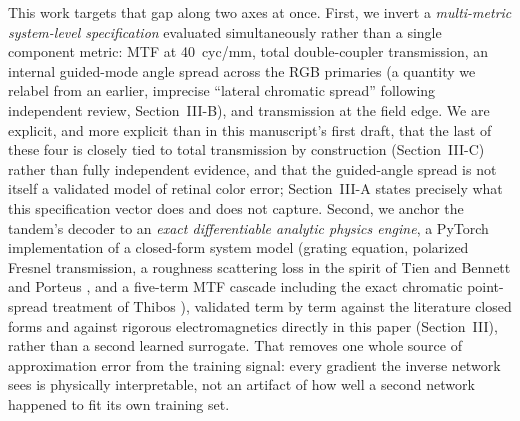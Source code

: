 \documentclass[10pt,twocolumn]{article}
\begin{document}
This work targets that gap along two axes at once. First, we invert a
\emph{multi-metric system-level specification} evaluated simultaneously
rather than a single component metric: MTF at 40~cyc/mm, total
double-coupler transmission, an internal guided-mode angle spread across
the RGB primaries (a quantity we relabel from an earlier, imprecise
``lateral chromatic spread'' following independent review, Section~III-B),
and transmission at the field edge. We are explicit, and more explicit than
in this manuscript's first draft, that the last of these four is closely
tied to total transmission by construction (Section~III-C) rather than
fully independent evidence, and that the guided-angle spread is not itself
a validated model of retinal color error; Section~III-A states precisely
what this specification vector does and does not capture. Second, we anchor
the tandem's decoder to an \emph{exact differentiable analytic physics
engine}, a PyTorch implementation of a closed-form system model (grating
equation, polarized Fresnel transmission, a roughness scattering loss in
the spirit of Tien \cite{tien1971} and Bennett and Porteus
\cite{bennett1961}, and a five-term MTF cascade including the exact
chromatic point-spread treatment of Thibos \cite{thibos1987}), validated
term by term against the literature closed forms and against rigorous
electromagnetics directly in this paper (Section~III), rather than a second
learned surrogate. That removes one whole source of approximation
error from the training signal: every gradient the inverse network sees is
physically interpretable, not an artifact of how well a second network
happened to fit its own training set.
\end{document}
